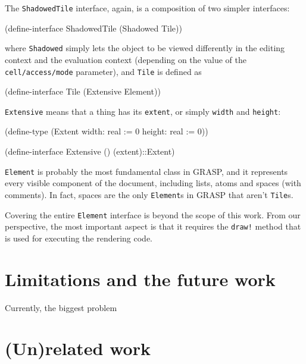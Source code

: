 \documentclass[acmsmall]{acmart}
\newenvironment{Snippet}{\Verbatim[samepage=true]}{\endVerbatim}
\begin{document}
The \texttt{ShadowedTile} interface, again, is a composition
of two simpler interfaces:

\begin{Snippet}
(define-interface ShadowedTile (Shadowed Tile))
\end{Snippet}

where \texttt{Shadowed} simply lets the object to be viewed
differently in the editing context and the evaluation context
(depending on the value of the \texttt{cell\-/access\-/mode}
parameter), and \texttt{Tile} is defined as

\begin{Snippet}
(define-interface Tile (Extensive Element))
\end{Snippet}

\texttt{Extensive} means that a thing has its \texttt{extent},
or simply \texttt{width} and \texttt{height}:

\begin{Snippet}
(define-type (Extent width: real := 0
                     height: real := 0))
  
(define-interface Extensive ()
  (extent)::Extent)
\end{Snippet}

\texttt{Element} is probably the most fundamental class in GRASP,
and it represents every visible component of the document, including
lists, atoms and spaces (with comments). In fact, spaces are the only
\texttt{Element}s in GRASP that aren't \texttt{Tile}s.

Covering the entire \texttt{Element} interface is beyond the scope
of this work. From our perspective, the most important aspect
is that it requires the \texttt{draw!} method that is used for
executing the rendering code.

\section{Limitations and the future work}

Currently, the biggest problem 


\section{(Un)related work}
\end{document}
